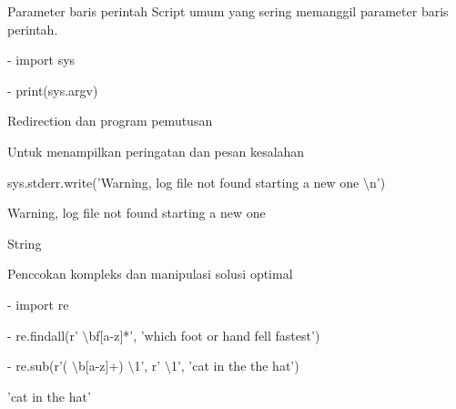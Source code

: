 {{{{{{{{{{{{\vspace{\baselineskip}
\noindent 
Parameter baris perintah
\vspace{\baselineskip}
\noindent 
Script umum yang sering memanggil parameter baris perintah.  \par
\vspace{\baselineskip}
\noindent 
- import sys \par
\vspace{\baselineskip}
\noindent 
- print(sys.argv) \par
\vspace{\baselineskip}
 \par
\vspace{\baselineskip}
\noindent 
\noindent 
{\fontsize{14pt}{14pt}\selectfont
Redirection dan program pemutusan \par
\vspace{\baselineskip}
\noindent 
Untuk menampilkan peringatan dan pesan kesalahan \par
\vspace{\baselineskip}
\noindent 
 sys.stderr.write('Warning, log file not found starting a new one $  \setminus  $n') \par
 \vspace{\baselineskip}
\noindent 
Warning, log file not found starting a new one \par
\vspace{\baselineskip}
\noindent 
String \par
\vspace{\baselineskip}
\noindent 
Penccokan kompleks dan manipulasi solusi optimal \par
\vspace{\baselineskip}
\noindent 
- import re \par
\vspace{\baselineskip}
\noindent 
- re.findall(r' $  \setminus  $bf[a-z]*', 'which foot or hand fell fastest') \par
\vspace{\baselineskip}
 \par
\vspace{\baselineskip}
\noindent 
- re.sub(r'( $  \setminus  $b[a-z]+)  $  \setminus  $1', r' $  \setminus  $1', 'cat in the the hat') \par
\vspace{\baselineskip}
\noindent 
'cat in the hat' \par
\vspace{\baselineskip}
}}}}}}}}}}}}}

